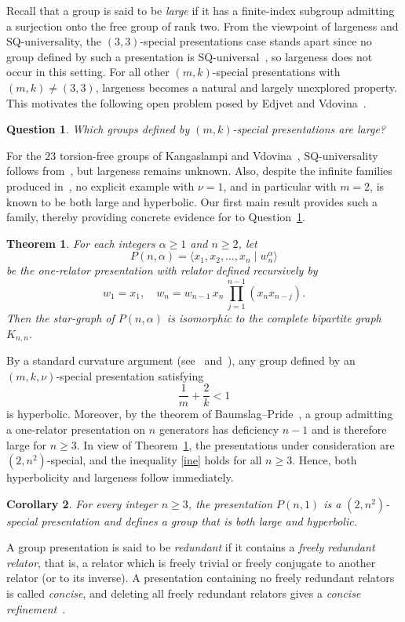 \documentclass[a4paper,12pt,oneside]{article}
\newtheorem{quest}[theorem]{Question}
\newtheorem{maintheorem}{Theorem}
\newtheorem{maincorollary}[maintheorem]{Corollary}
\begin{document}
\medskip
Recall that a group is said to be \emph{large} if it has a finite-index subgroup admitting a surjection onto the free group of rank two. From the viewpoint of largeness and SQ-universality, the $(3,3)$-special presentations case stands apart since no group defined by such a presentation is SQ-universal~\cite{EV10}, so largeness does not occur in this setting. For all other $(m,k)$-special presentations with $(m,k)\ne(3,3)$, largeness becomes a natural and largely unexplored property. This motivates the following open problem posed by Edjvet and Vdovina~\cite[Problem~2]{EV10}.


\begin{quest}\label{quest1}
Which groups defined by $(m,k)$-special presentations are large?
\end{quest}

\medskip
For the $23$ torsion-free groups of Kangaslampi and Vdovina~\cite{KV}, SQ-universality follows from~\cite[Theorem~2(v)]{EV10}, but largeness remains unknown. Also, despite the infinite families produced in~\cite{CW21}, no explicit example with $\nu=1$, and in particular with $m=2$, is known to be both large and hyperbolic.  Our first main result provides such a family, thereby providing concrete evidence for to Question~\ref{quest1}.

\begin{maintheorem}\label{main1}
For each integers $\alpha\ge1$ and $n\geq 2$, let
\[
P(n,\alpha)=\langle x_1, x_2, \dots, x_n \mid w_n^\alpha\rangle
\]
be the one-relator presentation with relator defined recursively by
\[
w_1 = x_1, \quad
w_n = w_{n-1}\, x_n \, \prod_{j=1}^{n-1}(x_n x_{n-j}).
\]
Then the star-graph of \(P(n,\alpha)\) is isomorphic to the complete bipartite graph $K_{n,n}$.
\end{maintheorem}
By a standard curvature argument (see~\cite[Proof of Theorem~2]{EV10} and~\cite{GS90}), any group defined by an $(m,k,\nu)$-special presentation satisfying
\begin{equation}\label{ine}
\frac{1}{m}+\frac{2}{k}<1
\end{equation}
is hyperbolic. Moreover, by the theorem of Baumslag--Pride~\cite{BP}, a group admitting a one-relator presentation on $n$ generators has deficiency $n-1$ and is therefore large for $n\ge3$. In view of Theorem~\ref{main1}, the presentations under consideration are $(2,n^2)$-special, and the inequality \eqref{ine} holds for all $n\ge3$. Hence, both hyperbolicity and largeness follow immediately.

\begin{maincorollary}\label{maincor1}
For every integer $n \ge 3$, the presentation $P(n,1)$ is a $(2,n^2)$-special presentation and defines a group that is both large and hyperbolic.
\end{maincorollary}
A group presentation is said to be \emph{redundant} if it contains a \emph{freely redundant relator}, that is, a relator which is freely trivial or freely conjugate to another relator (or to its inverse). A presentation containing no freely redundant relators is called \emph{concise}, and deleting all freely redundant relators gives a \emph{concise refinement}~\cite{CCH81}.
\end{document}
